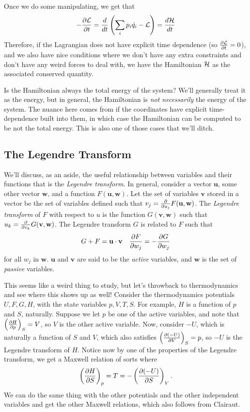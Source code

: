 Once we do some manipulating, we get that 
\[
  -\frac{\partial \mathcal{L}}{\partial t} = \frac{d }{d t} \left(\sum_i p_i\dot{q_i} - \mathcal{L} \right) = \frac{d \mathcal{H}}{d t}
\]
Therefore, if the Lagrangian does not have explicit time dependence (so $\frac{\partial \mathcal{L}}{\partial t} = 0$), and we also have nice conditions where we don't have any extra constraints and don't have any weird forces to deal with, we have the Hamiltonian $\mathcal{H}$ as the associated conserved quantity. 

Is the Hamiltonian always the total energy of the system? We'll generally treat it as the energy, but in general, the Hamiltonian is \textit{not necessarily} the energy of the system. The nuance here comes from if the coordinates have explicit time-dependence built into them, in which case the Hamiltonian can be computed to be not the total energy. This is also one of those cases that we'll ditch. 

\subsection{The Legendre Transform}
We'll discuss, as an aside, the useful relationship between variables and their functions that is the \textit{Legendre transform}. In general, consider a vector $\mathbf{u}$, some other vector $\mathbf{w}$, and a function $F(\mathbf{u}, \mathbf{w})$. Let the set of variables $\textbf{v}$ stored in a vector be the set of variables defined such that $v_j = \frac{\partial }{\partial u_j} F(\mathbf{u}, \mathbf{w})$. The \textit{Legendre transform} of $F$ with respect to $u$ is the function $G(\textbf{v}, \textbf{w})$ such that $u_k = \frac{\partial }{\partial v_k} G(\textbf{v}, \textbf{w})$. The Legendre transform $G$ is related to $F$ such that
\[
	G + F = \textbf{u} \cdot \textbf{v} \quad \frac{\partial F}{\partial w_j} = - \frac{\partial G}{\partial w_j}
\]
for all $w_j$ in $\textbf{w}$. $\textbf{u}$ and $\textbf{v}$ are said to be the \textit{active} variables, and $\textbf{w}$ is the set of \textit{passive} variables.

This seems like a weird thing to study, but let's throwback to thermodynamics and see where this shows up as well! Consider the thermodynamics potentials $U, F, G, H$, with the state variables $p, V, T, S$. For example, $H$ is a function of $p$ and $S$, naturally. Suppose we let $p$ be one of the active variables, and note that $\left(\frac{\partial H}{\partial p}\right)_{S} = V$, so $V$ is the other active variable. Now, consider $-U$, which is naturally a function of $S$ and $V$, which also satisfies $\left(\frac{\partial (-U)}{\partial V}\right)_{S} = p$, so $-U$ is the Legendre transform of $H$. Notice now by one of the properties of the Legendre transform, we get a Maxwell relation of sorts where 
\[
	\left(\frac{\partial H}{\partial S}\right)_{p} = T = -\left(\frac{\partial (-U)}{\partial S}\right)_{V}.
\]
We can do the same thing with the other potentials and the other independent variables and get the other Maxwell relations, which also follows from Clairaut.  

